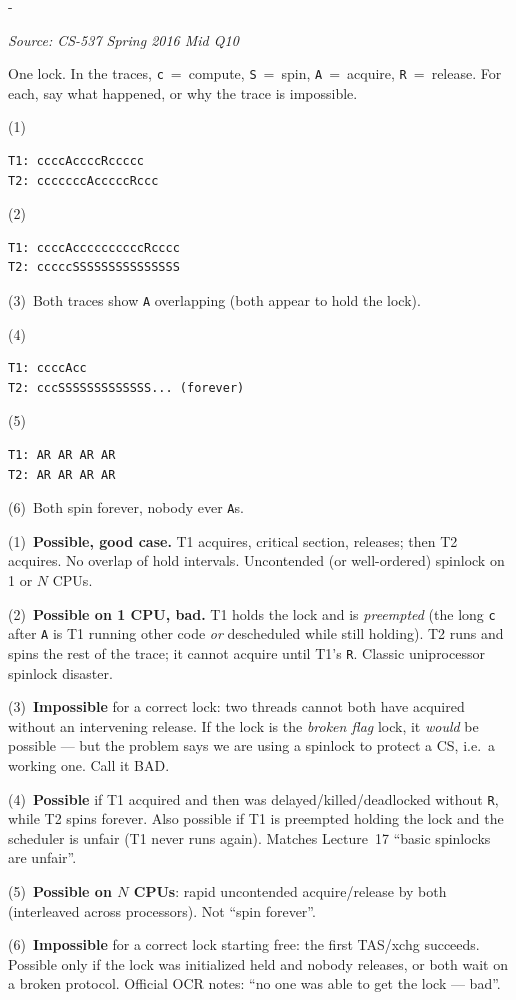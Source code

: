 \documentclass[11pt,a4paper]{article}
\makeatletter
\newcommand{\keepspace}[1]{\par\penalty-100\begingroup
  \setlength{\dimen@}{#1}\dimen@ii\pagegoal\advance\dimen@ii-\pagetotal
  \ifdim\dimen@>\dimen@ii\ifdim\dimen@ii>\z@\vfil\fi\break\fi\endgroup}
\newcounter{qn}[section]
\newenvironment{Qn}[4]{%
  \refstepcounter{qn}\keepspace{7\baselineskip}%
  \begin{tcolorbox}[qboxstyle, title={Q\thesection.\theqn\ \ [#1 \textbar\ #2]\ \ #4}]%
  {\footnotesize\color{g3}\textit{Source: #3}}\par\smallskip%
}{%
  \end{tcolorbox}%
}
\newenvironment{Sol}{%
  \begin{tcolorbox}[sboxstyle, title={Solution}]%
}{%
  \end{tcolorbox}\vspace{0.35em}%
}
\makeatother
\begin{document}
\begin{Qn}{Hard}{Lect 17}{CS-537 Spring 2016 Mid Q10}{Which spinlock timelines are possible?}
One lock. In the traces, \texttt{c}~=~compute, \texttt{S}~=~spin, \texttt{A}~=~acquire, \texttt{R}~=~release. For each, say what happened, or why the trace is impossible.

(1)
\begin{lstlisting}[numbers=none]
T1: ccccAccccRccccc
T2: cccccccAcccccRccc
\end{lstlisting}

(2)
\begin{lstlisting}[numbers=none]
T1: ccccAccccccccccRcccc
T2: cccccSSSSSSSSSSSSSSS
\end{lstlisting}

(3)~Both traces show \texttt{A} overlapping (both appear to hold the lock).

(4)
\begin{lstlisting}[numbers=none]
T1: ccccAcc
T2: cccSSSSSSSSSSSSS... (forever)
\end{lstlisting}

(5)
\begin{lstlisting}[numbers=none]
T1: AR AR AR AR
T2: AR AR AR AR
\end{lstlisting}

(6)~Both spin forever, nobody ever \texttt{A}s.
\end{Qn}
\begin{Sol}
(1)~\textbf{Possible, good case.} T1 acquires, critical section, releases; then T2 acquires. No overlap of hold intervals. Uncontended (or well-ordered) spinlock on 1 or $N$ CPUs.

(2)~\textbf{Possible on 1 CPU, bad.} T1 holds the lock and is \emph{preempted} (the long \texttt{c} after \texttt{A} is T1 running other code \emph{or} descheduled while still holding). T2 runs and spins the rest of the trace; it cannot acquire until T1's \texttt{R}. Classic uniprocessor spinlock disaster.

(3)~\textbf{Impossible} for a correct lock: two threads cannot both have acquired without an intervening release. If the lock is the \emph{broken flag} lock, it \emph{would} be possible --- but the problem says we are using a spinlock to protect a CS, i.e.\ a working one. Call it BAD.

(4)~\textbf{Possible} if T1 acquired and then was delayed/killed/deadlocked without \texttt{R}, while T2 spins forever. Also possible if T1 is preempted holding the lock and the scheduler is unfair (T1 never runs again). Matches Lecture~17 ``basic spinlocks are unfair''.

(5)~\textbf{Possible on $N$ CPUs}: rapid uncontended acquire/release by both (interleaved across processors). Not ``spin forever''.

(6)~\textbf{Impossible} for a correct lock starting free: the first TAS/xchg succeeds. Possible only if the lock was initialized held and nobody releases, or both wait on a broken protocol. Official OCR notes: ``no one was able to get the lock --- bad''.
\end{Sol}
\end{document}
